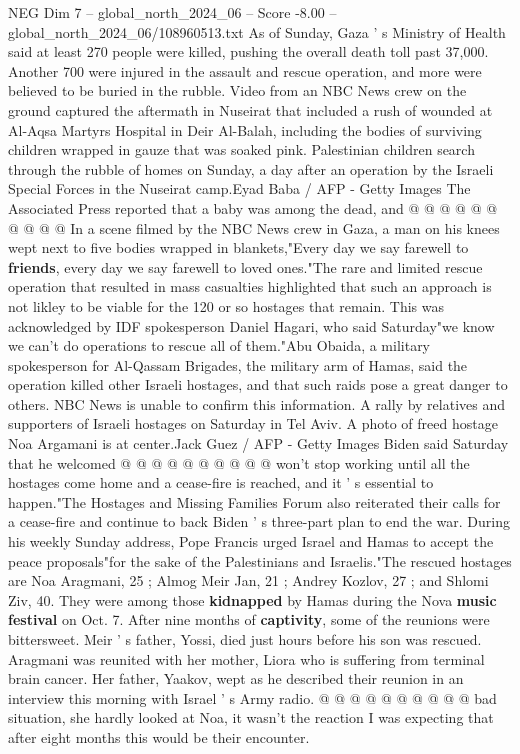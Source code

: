 \begin{textsample}{NEG Dim 7 – global\_north\_2024\_06 – Score -8.00 – global\_north\_2024\_06/108960513.txt}
As of Sunday, Gaza ' s Ministry of Health said at least 270 people were killed, pushing the overall death toll past 37,000.
Another 700 were injured in the assault and rescue operation, and more were believed to be buried in the rubble.
Video from an NBC News crew on the ground captured the aftermath in Nuseirat that included a rush of wounded at Al-Aqsa Martyrs Hospital in Deir Al-Balah, including the bodies of surviving children wrapped in gauze that was soaked pink.
Palestinian children search through the rubble of homes on Sunday, a day after an operation by the Israeli Special Forces in the Nuseirat camp.Eyad Baba / AFP - Getty Images The Associated Press reported that a baby was among the dead, and @ @ @ @ @ @ @ @ @ @ In a scene filmed by the NBC News crew in Gaza, a man on his knees wept next to five bodies wrapped in blankets,"Every day we say farewell to \textbf{friends}, every day we say farewell to loved ones."The rare and limited rescue operation that resulted in mass casualties highlighted that such an approach is not likley to be viable for the 120 or so hostages that remain.
This was acknowledged by IDF spokesperson Daniel Hagari, who said Saturday"we know we can't do operations to rescue all of them."Abu Obaida, a military spokesperson for Al-Qassam Brigades, the military arm of Hamas, said the operation killed other Israeli hostages, and that such raids pose a great danger to others.
NBC News is unable to confirm this information.
A rally by relatives and supporters of Israeli hostages on Saturday in Tel Aviv.
A photo of freed hostage Noa Argamani is at center.Jack Guez / AFP - Getty Images Biden said Saturday that he welcomed @ @ @ @ @ @ @ @ @ @ won't stop working until all the hostages come home and a cease-fire is reached, and it ' s essential to happen."The Hostages and Missing Families Forum also reiterated their calls for a cease-fire and continue to back Biden ' s three-part plan to end the war.
During his weekly Sunday address, Pope Francis urged Israel and Hamas to accept the peace proposals"for the sake of the Palestinians and Israelis."The rescued hostages are Noa Aragmani, 25 ; Almog Meir Jan, 21 ; Andrey Kozlov, 27 ; and Shlomi Ziv, 40.
They were among those \textbf{kidnapped} by Hamas during the Nova \textbf{music} \textbf{festival} on Oct. 7.
After nine months of \textbf{captivity}, some of the reunions were bittersweet.
Meir ' s father, Yossi, died just hours before his son was rescued.
Aragmani was reunited with her mother, Liora who is suffering from terminal brain cancer.
Her father, Yaakov, wept as he described their reunion in an interview this morning with Israel ' s Army radio. @ @ @ @ @ @ @ @ @ @ bad situation, she hardly looked at Noa, it wasn't the reaction I was expecting that after eight months this would be their encounter.

\end{textsample}
